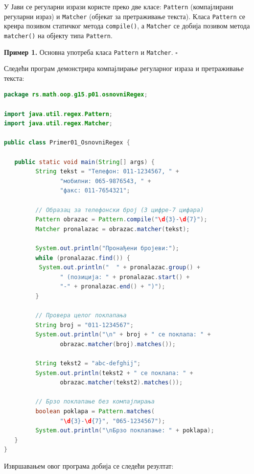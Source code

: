 У Јави се регуларни изрази користе преко две класе: \texttt{Pattern} (компајлирани регуларни израз) и \texttt{Matcher} (објекат за претраживање текста). Класа \texttt{Pattern} се креира позивом статичког метода \texttt{compile()}, а \texttt{Matcher} се добија позивом метода \texttt{matcher()} на објекту типа \texttt{Pattern}.


\bigskip

\noindent \textbf{Пример 1.} Основна употреба класа \texttt{Pattern} и \texttt{Matcher}. $\square$

\medskip

Следећи програм демонстрира компајлирање регуларног израза и претраживање текста:


\begin{lstlisting}[language=Java]
package rs.math.oop.g15.p01.osnovniRegex;
 
import java.util.regex.Pattern;
import java.util.regex.Matcher;
 
public class Primer01_OsnovniRegex {
 
   public static void main(String[] args) {
         String tekst = "Телефон: 011-1234567, " +
                "мобилни: 065-9876543, " +
                "факс: 011-7654321";
 
         // Образац за телефонски број (3 цифре-7 цифара)
         Pattern obrazac = Pattern.compile("\d{3}-\d{7}");
         Matcher pronalazac = obrazac.matcher(tekst);
 
         System.out.println("Пронађени бројеви:");
         while (pronalazac.find()) {
          System.out.println("  " + pronalazac.group() +
                " (позиција: " + pronalazac.start() +
                "-" + pronalazac.end() + ")");
         }
 
         // Провера целог поклапања
         String broj = "011-1234567";
         System.out.println("\n" + broj + " се поклапа: " +
                obrazac.matcher(broj).matches());
 
         String tekst2 = "abc-defghij";
         System.out.println(tekst2 + " се поклапа: " +
                obrazac.matcher(tekst2).matches());
 
         // Брзо поклапање без компајлирања
         boolean poklapa = Pattern.matches(
                "\d{3}-\d{7}", "065-1234567");
         System.out.println("\nБрзо поклапање: " + poklapa);
   }
}
\end{lstlisting}


Извршавањем овог програма добија се следећи резултат:


